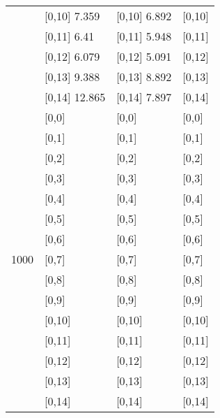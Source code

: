 \begin{table}
\begin{tabular}[t]{llll}
\addlinespace
 & {}[0,10] 7.359 & {}[0,10] 6.892 & {}[0,10]\\
 & {}[0,11] 6.41 & {}[0,11] 5.948 & {}[0,11]\\
 & {}[0,12] 6.079 & {}[0,12] 5.091 & {}[0,12]\\
 & {}[0,13] 9.388 & {}[0,13] 8.892 & {}[0,13]\\
 & {}[0,14] 12.865 & {}[0,14] 7.897 & {}[0,14]\\
\addlinespace
 & {}[0,0] & {}[0,0] & {}[0,0]\\
 & {}[0,1] & {}[0,1] & {}[0,1]\\
 & {}[0,2] & {}[0,2] & {}[0,2]\\
 & {}[0,3] & {}[0,3] & {}[0,3]\\
 & {}[0,4] & {}[0,4] & {}[0,4]\\
\addlinespace
 & {}[0,5] & {}[0,5] & {}[0,5]\\
 & {}[0,6] & {}[0,6] & {}[0,6]\\
1000 & {}[0,7] & {}[0,7] & {}[0,7]\\
 & {}[0,8] & {}[0,8] & {}[0,8]\\
 & {}[0,9] & {}[0,9] & {}[0,9]\\
\addlinespace
 & {}[0,10] & {}[0,10] & {}[0,10]\\
 & {}[0,11] & {}[0,11] & {}[0,11]\\
 & {}[0,12] & {}[0,12] & {}[0,12]\\
 & {}[0,13] & {}[0,13] & {}[0,13]\\
 & {}[0,14] & {}[0,14] & {}[0,14]\\
\bottomrule
\end{tabular}
\end{table}
